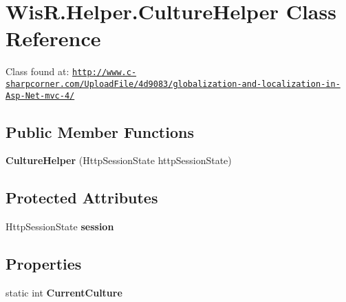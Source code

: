 \hypertarget{class_wis_r_1_1_helper_1_1_culture_helper}{}\section{Wis\+R.\+Helper.\+Culture\+Helper Class Reference}
\label{class_wis_r_1_1_helper_1_1_culture_helper}


Class found at\+: \href{http://www.c-sharpcorner.com/UploadFile/4d9083/globalization-and-localization-in-Asp-Net-mvc-4/}{\tt http\+://www.\+c-\/sharpcorner.\+com/\+Upload\+File/4d9083/globalization-\/and-\/localization-\/in-\/\+Asp-\/\+Net-\/mvc-\/4/}  


\subsection*{Public Member Functions}
\begin{DoxyCompactItemize}
\item 
\hypertarget{class_wis_r_1_1_helper_1_1_culture_helper_a9cfb165acb4bdf76b627ea5bf491e13c}{}{\bfseries Culture\+Helper} (Http\+Session\+State http\+Session\+State)\label{class_wis_r_1_1_helper_1_1_culture_helper_a9cfb165acb4bdf76b627ea5bf491e13c}

\end{DoxyCompactItemize}
\subsection*{Protected Attributes}
\begin{DoxyCompactItemize}
\item 
\hypertarget{class_wis_r_1_1_helper_1_1_culture_helper_a0520b9f34667e33d292f9b2c8608dd48}{}Http\+Session\+State {\bfseries session}\label{class_wis_r_1_1_helper_1_1_culture_helper_a0520b9f34667e33d292f9b2c8608dd48}

\end{DoxyCompactItemize}
\subsection*{Properties}
\begin{DoxyCompactItemize}
\item 
\hypertarget{class_wis_r_1_1_helper_1_1_culture_helper_aceb69d94aa214fd127979657d99234a4}{}static int {\bfseries Current\+Culture}\label{class_wis_r_1_1_helper_1_1_culture_helper_aceb69d94aa214fd127979657d99234a4}

\end{DoxyCompactItemize}



